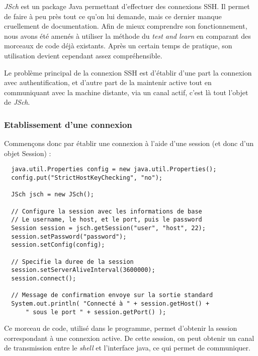 \par \emph{JSch} est un package Java permettant d'effectuer des connexions SSH. Il permet de faire à peu près tout ce qu'on lui demande, mais ce dernier manque cruellement de documentation. Afin de mieux comprendre son fonctionnement, nous avons été amenés à utiliser la méthode du \emph{test and learn} en comparant des morceaux de code déjà existants. Après un certain temps de pratique, son utilisation devient cependant assez compréhensible.

\par Le problème principal de la connexion SSH est d'établir d'une part la connexion avec authentification, et d'autre part de la maintenir active tout en communiquant avec la machine distante, via un canal actif, c'est là tout l'objet de \emph{JSch}.

\subsubsection{Etablissement d'une connexion}
\label{sec:etabl-dune-conn}

\par Commençons donc par établir une connexion à l'aide d'une session (et donc d'un objet Session) :

\begin{verbatim}
  java.util.Properties config = new java.util.Properties(); 
  config.put("StrictHostKeyChecking", "no");
  
  JSch jsch = new JSch();

  // Configure la session avec les informations de base
  // Le username, le host, et le port, puis le password
  Session session = jsch.getSession("user", "host", 22);
  session.setPassword("password");
  session.setConfig(config);

  // Specifie la duree de la session
  session.setServerAliveInterval(3600000);
  session.connect();

  // Message de confirmation envoye sur la sortie standard
  System.out.println( "Connecté à " + session.getHost() + 
      " sous le port " + session.getPort() );
\end{verbatim}

\par Ce morceau de code, utilisé dans le programme, permet d'obtenir la session correspondant à une connexion active. De cette session, on peut obtenir un canal de transmission entre le \emph{shell} et l'interface java, ce qui permet de communiquer.

